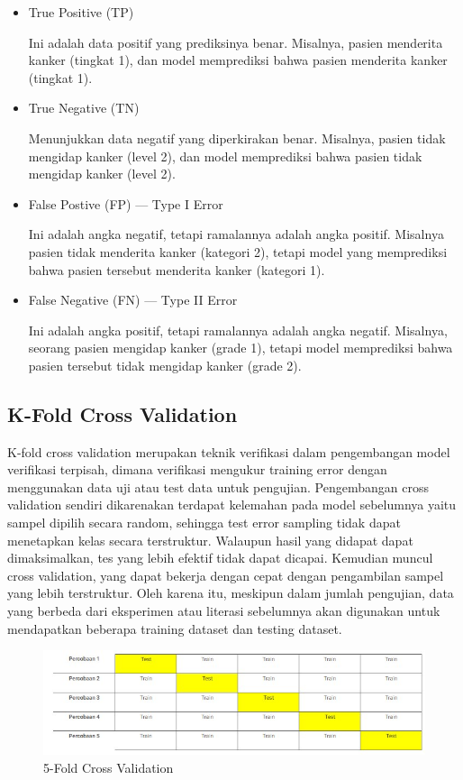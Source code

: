 \begin{itemize}
    \item True Positive (TP)
    \par Ini adalah data positif yang prediksinya benar. Misalnya, pasien menderita kanker (tingkat 1), dan model memprediksi bahwa pasien menderita kanker (tingkat 1).
    \item True Negative (TN)
    \par Menunjukkan data negatif yang diperkirakan benar. Misalnya, pasien tidak mengidap kanker (level 2), dan model memprediksi bahwa pasien tidak mengidap kanker (level 2).
    \item False Postive (FP) — Type I Error
    \par Ini adalah angka negatif, tetapi ramalannya adalah angka positif. Misalnya pasien tidak menderita kanker (kategori 2), tetapi model yang memprediksi bahwa pasien tersebut menderita kanker (kategori 1).
    \item False Negative (FN) — Type II Error
    \par Ini adalah angka positif, tetapi ramalannya adalah angka negatif. Misalnya, seorang pasien mengidap kanker (grade 1), tetapi model memprediksi bahwa pasien tersebut tidak mengidap kanker (grade 2).
\end{itemize}

\subsection{K-Fold Cross Validation}

\par K-fold cross validation merupakan teknik verifikasi dalam pengembangan model verifikasi terpisah, dimana verifikasi mengukur training error dengan menggunakan data uji atau test data untuk pengujian. Pengembangan cross validation sendiri dikarenakan terdapat kelemahan pada model sebelumnya yaitu sampel dipilih secara random, sehingga test error sampling tidak dapat menetapkan kelas secara terstruktur. Walaupun hasil yang didapat dapat dimaksimalkan, tes yang lebih efektif tidak dapat dicapai. Kemudian muncul cross validation, yang dapat bekerja dengan cepat dengan pengambilan sampel yang lebih terstruktur. Oleh karena itu, meskipun dalam jumlah pengujian, data yang berbeda dari eksperimen atau literasi sebelumnya akan digunakan untuk mendapatkan beberapa training dataset dan testing dataset.\cite{cross}

\begin{figure}[H]
    \centering
    \includegraphics[width=12cm]{figures/chapter2/7.jpg}
    \caption{5-Fold Cross Validation}
\end{figure}

